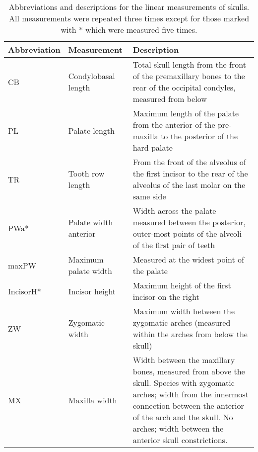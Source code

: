 \begin{center}

\begin{longtable} {p{}p{}p{}}
\caption[Skull measurements] {Abbreviations and descriptions for the linear measurements of skulls. All measurements were repeated three times except for those marked with * which were measured five times.}\\

\hline
\textbf{Abbreviation} & \textbf{Measurement} & \textbf{Description}\\
\hline
CB & Condylobasal length & Total skull length from the front of the premaxillary  bones to the rear of the occipital condyles, measured from below \\
PL & Palate length & Maximum length of the palate from the anterior of the pre-maxilla to the posterior of the hard palate\\
TR & Tooth row length & From the front of the alveolus of the first incisor to the rear of the alveolus of the last molar on the same side\\
PWa* & Palate width anterior & Width across the palate measured between the posterior, outer-most points of the alveoli of the first pair of teeth\\
maxPW & Maximum palate width & Measured at the widest point of the palate\\
IncisorH* & Incisor height & Maximum height of the first incisor on the right\\
ZW & Zygomatic width & Maximum width between the zygomatic arches (measured within the arches from below the skull)\\
MX & Maxilla width & Width between the maxillary bones, measured from above the skull. Species with zygomatic arches; width from the innermost connection between the anterior of the arch and the skull. No arches; width between the anterior skull constrictions.\\ 

\end{longtable}
\end{center}
